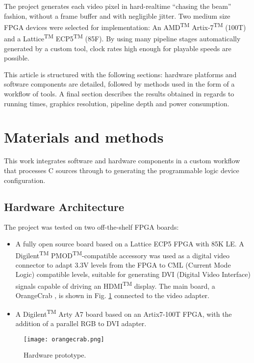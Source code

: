 \documentclass[conference]{IEEEtran}
\begin{document}
The project generates each video pixel in hard-realtime “chasing the beam” fashion, without a frame buffer and with negligible jitter. Two medium size FPGA devices were selected for implementation: An  AMD\textsuperscript{TM}  Artix-7\textsuperscript{TM} (100T) and a Lattice\textsuperscript{TM}  ECP5\textsuperscript{TM} (85F). By using many pipeline stages automatically generated by a custom tool, clock rates high enough for playable speeds are possible.

This article is structured with the following sections: hardware platforms and software components are detailed, followed by methods used in the form of a workflow of tools. A final section describes the results obtained in regards to running times, graphics resolution, pipeline depth and power consumption.
\\

\section{Materials and methods}
This work integrates software and hardware components in a custom workflow that processes C sources through to generating the programmable logic device configuration.

\subsection{Hardware Architecture}
The project was tested on two off-the-shelf FPGA boards:

\begin{itemize}
\item A fully open source board based on a Lattice ECP5 FPGA with 85K LE. A Digilent\textsuperscript{TM} PMOD\textsuperscript{TM}-compatible accessory was used as a digital video connector to adapt 3.3V levels from the FPGA to CML (Current Mode Logic) compatible levels, suitable for generating DVI (Digital Video Interface) signals capable of driving an HDMI\textsuperscript{TM} display. The main board, a OrangeCrab \cite{orangecrab}, is shown in Fig. \ref{figboard} connected to the video adapter.
\item  A Digilent\textsuperscript{TM}  Arty A7 board based on an Artix7-100T FPGA, with the addition of a parallel RGB to DVI adapter.
\end{itemize}

\begin{figure}
\texttt{[image: orangecrab.png]}
\caption{Hardware prototype.}
\label{figboard}
\end{figure}
\end{document}
